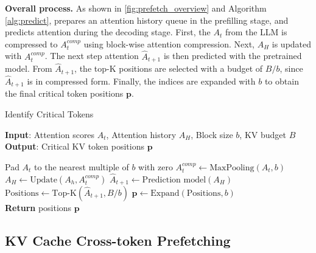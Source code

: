 \textbf{Overall process.}
As shown in \autoref{fig:prefetch_overview} and Algorithm \ref{alg:predict}, \ours prepares an attention history queue in the prefilling stage, and predicts attention during the decoding stage. First, the $A_t$ from the LLM is compressed to $A_t^{comp}$ using block-wise attention compression. Next, $A_H$ is updated with $A_t^{comp}$. The next step attention $\hat{A}_{t+1}$ is then predicted with the pretrained model. From $\hat{A}_{t+1}$, the top-K positions are selected with a budget of $B/b$, since $\hat{A}_{t+1}$ is in compressed form. Finally, the indices are expanded with $b$ to obtain the final critical token positions
$\mathbf{p}$.

\begin{algorithm}[ht!]
   \caption{Identify Critical Tokens}
   \label{alg:predict}
   
    \textbf{Input}: Attention scores $A_t$, Attention history $A_H$, Block size $b$, KV budget $B$
    \\
    \textbf{Output}: Critical KV token positions $\mathbf{p}$
    
    \begin{algorithmic}[1]
    \STATE Pad $A_t$ to the nearest multiple of $b$ with zero
    \STATE $A_t^{comp} \gets \text{MaxPooling}(A_t, b)$
    \STATE $A_H \gets \text{Update}(A_h, A_t^{comp})$
    \STATE $\hat{A}_{t+1} \gets \text{Prediction model}(A_H)$
    \STATE $\text{Positions} \gets \text{Top-K}(\hat{A}_{t+1}, B / b)$
    \STATE $\mathbf{p} \gets \text{Expand}(\text{Positions}, b)$ \\
    \textbf{Return} positions $\mathbf{p} $
    \end{algorithmic}
\end{algorithm}


\subsection{KV Cache Cross-token Prefetching} \label{section: prefetch}

